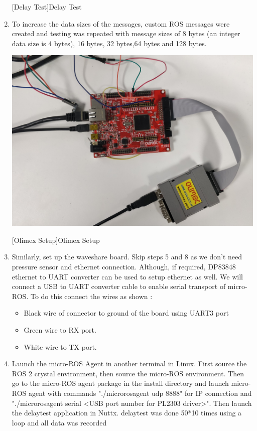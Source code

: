 \documentclass[%
xelatex,
	oneside,		%
	12pt,			%
	parskip=half,	%
	abstracton,
	chapterprefix=true%
    appendixprefix=true]
{scrbook}
\begin{document}
\begin{enumerate}
\begin{center}
[Delay Test]{Delay Test}
\label{fig:delay}
\end{center}
\item To increase the data sizes of the messages, custom ROS messages were created and testing was repeated with message sizes of 8 bytes (an integer data size is 4 bytes), 16 bytes, 32 bytes,64 bytes and 128 bytes.
\begin{center}
\includegraphics[scale=0.1]{fig/olimex.jpg}

[Olimex Setup]{Olimex Setup}
\label{fig:olimexsetup}
\end{center}
\item Similarly, set up the waveshare board. Skip steps 5 and 8 as we don't need pressure sensor and ethernet connection. Although, if required, DP83848 ethernet to UART converter can be used to setup ethernet as well. We will connect a USB to UART converter cable to enable serial transport of micro-ROS. To do this connect the wires as shown : 
\begin{itemize}
\item Black wire of connector to ground of the board using UART3 port
\item Green wire to RX port.
\item White wire to TX port.
\end{itemize}
\item Launch the micro-ROS Agent in another terminal in Linux. First source the ROS 2 crystal environment, then source the micro-ROS environment. Then go to the micro-ROS agent package in the install directory and launch micro-ROS agent with commands "./micro\textunderscore ros\textunderscore agent udp 8888" for IP connection and "./micro\textunderscore ros\textunderscore agent serial <USB port number for PL2303 driver>". Then launch the delay\textunderscore test application in Nuttx. delay\textunderscore test was done 50*10 times using a loop and all data was recorded
\end{enumerate}
\end{document}
